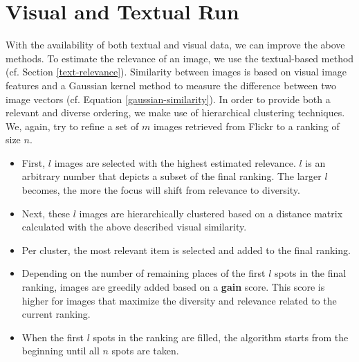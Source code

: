 \documentclass{acm_proc_article-me11_tweaked}
\begin{document}
\section{Visual and Textual Run}
With the availability of both textual and visual data, we can improve the above methods.
To estimate the relevance of an image, we use the textual-based method (cf. Section \ref{text-relevance}).
Similarity between images is based on visual image features and a Gaussian kernel method to measure the difference between two image vectors (cf. Equation \ref{gaussian-similarity}).
In order to provide both a relevant and diverse ordering, we make use of hierarchical clustering techniques.
We, again, try to refine a set of $m$ images retrieved from Flickr to a ranking of size $n$.
\begin{itemize}
 \item First, $l$ images are selected with the highest estimated relevance. $l$ is an arbitrary number that depicts a subset of the final ranking. 
The larger $l$ becomes, the more the focus will shift from relevance to diversity. 
 \item Next, these $l$ images are hierarchically clustered based on a distance matrix calculated with the above described visual similarity.
 \item Per cluster, the most relevant item is selected and added to the final ranking.
 \item Depending on the number of remaining places of the first $l$ spots in the final ranking, images are greedily added based on a \textbf{gain} score.
 This score is higher for images that maximize the diversity and relevance related to the current ranking.
 \item When the first $l$ spots in the ranking are filled, the algorithm starts from the beginning until all $n$ spots are taken.
 
\end{itemize}
\end{document}
